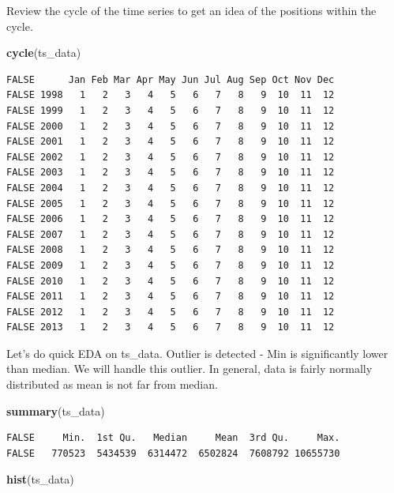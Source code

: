 \documentclass[openany]{book}
\newenvironment{Shaded}{\begin{snugshade}}{\end{snugshade}}
\newcommand{\KeywordTok}[1]{\textcolor[rgb]{0.13,0.29,0.53}{\textbf{#1}}}
\newcommand{\NormalTok}[1]{#1}
\begin{document}
Review the cycle of the time series to get an idea of the positions
within the cycle.

\begin{Shaded}
\begin{Highlighting}[]
\KeywordTok{cycle}\NormalTok{(ts_data)}
\end{Highlighting}
\end{Shaded}

\begin{verbatim}
FALSE      Jan Feb Mar Apr May Jun Jul Aug Sep Oct Nov Dec
FALSE 1998   1   2   3   4   5   6   7   8   9  10  11  12
FALSE 1999   1   2   3   4   5   6   7   8   9  10  11  12
FALSE 2000   1   2   3   4   5   6   7   8   9  10  11  12
FALSE 2001   1   2   3   4   5   6   7   8   9  10  11  12
FALSE 2002   1   2   3   4   5   6   7   8   9  10  11  12
FALSE 2003   1   2   3   4   5   6   7   8   9  10  11  12
FALSE 2004   1   2   3   4   5   6   7   8   9  10  11  12
FALSE 2005   1   2   3   4   5   6   7   8   9  10  11  12
FALSE 2006   1   2   3   4   5   6   7   8   9  10  11  12
FALSE 2007   1   2   3   4   5   6   7   8   9  10  11  12
FALSE 2008   1   2   3   4   5   6   7   8   9  10  11  12
FALSE 2009   1   2   3   4   5   6   7   8   9  10  11  12
FALSE 2010   1   2   3   4   5   6   7   8   9  10  11  12
FALSE 2011   1   2   3   4   5   6   7   8   9  10  11  12
FALSE 2012   1   2   3   4   5   6   7   8   9  10  11  12
FALSE 2013   1   2   3   4   5   6   7   8   9  10  11  12
\end{verbatim}

Let's do quick EDA on ts\_data. Outlier is detected - Min is
significantly lower than median. We will handle this outlier. In
general, data is fairly normally distributed as mean is not far from
median.

\begin{Shaded}
\begin{Highlighting}[]
\KeywordTok{summary}\NormalTok{(ts_data)}
\end{Highlighting}
\end{Shaded}

\begin{verbatim}
FALSE     Min.  1st Qu.   Median     Mean  3rd Qu.     Max. 
FALSE   770523  5434539  6314472  6502824  7608792 10655730
\end{verbatim}

\begin{Shaded}
\begin{Highlighting}[]
\KeywordTok{hist}\NormalTok{(ts_data)}
\end{Highlighting}
\end{Shaded}
\end{document}
